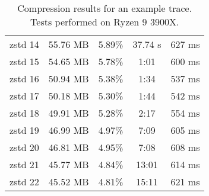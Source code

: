 \documentclass[hidelinks,titlepage,a4paper,twoside]{article}
\begin{document}
\begin{table}
\begin{tabular}[h]{c|c|c|c|c}
zstd 14 & 55.76 MB & 5.89\% & 37.74 \si{\second} & 627 \si{\milli\second} \\
zstd 15 & 54.65 MB & 5.78\% & 1:01 & 600 \si{\milli\second} \\
zstd 16 & 50.94 MB & 5.38\% & 1:34 & 537 \si{\milli\second} \\
zstd 17 & 50.18 MB & 5.30\% & 1:44 & 542 \si{\milli\second} \\
zstd 18 & 49.91 MB & 5.28\% & 2:17 & 554 \si{\milli\second} \\
zstd 19 & 46.99 MB & 4.97\% & 7:09 & 605 \si{\milli\second} \\
zstd 20 & 46.81 MB & 4.95\% & 7:08 & 608 \si{\milli\second} \\
zstd 21 & 45.77 MB & 4.84\% & 13:01 & 614 \si{\milli\second} \\
zstd 22 & 45.52 MB & 4.81\% & 15:11 & 621 \si{\milli\second}
\end{tabular}
\caption{Compression results for an example trace. \\ Tests performed on Ryzen 9 3900X.}
\label{compressiontimes}
\end{table}
\end{document}
